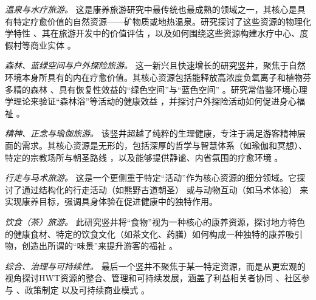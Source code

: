 \documentclass[UTF8, 12pt, a4paper, twoside]{ctexart}
\begin{document}
\textit{温泉与水疗旅游。} 这是康养旅游研究中最传统也最成熟的领域之一，其核心是具有特定疗愈价值的自然资源——矿物质或地热温泉。研究探讨了这些资源的物理化学特性 \parencite{dobrzynskiHydrogeochemicalBiomedicalInsights2018, zeynalPhysicalchemicalTreatmentPeculiarities2022a}、其在旅游开发中的价值评估 \parencite{borovicUtilizationTourismValorisation2015}，以及如何围绕这些资源构建水疗中心、度假村等商业实体 \parencite{chen2013investigating, dryglas2024critical, medaiFactorsContributingTourism2022a}。

\textit{森林、蓝绿空间与户外探险旅游。} 这一新兴且快速增长的研究竖井，聚焦于自然环境本身所具有的内在疗愈价值。其核心资源包括能释放高浓度负氧离子和植物芬多精的森林 \parencite{sorokaImportanceForestResources2016b, zoric2022developing}、具有恢复性效益的“绿色空间”与“蓝色空间” \parencite{irvineUnderstandingUrbanGreen2013, foleySwimmingIrelandImmersions2015}。研究常借鉴环境心理学理论来验证“森林浴”等活动的健康效益 \parencite{farkic2021forest, ohe2017evaluating}，并探讨户外探险活动如何促进身心福祉 \parencite{hannaActiveEngagementNature2019}。

\textit{精神、正念与瑜伽旅游。} 该竖井超越了纯粹的生理健康，专注于满足游客精神层面的需求。其核心资源是无形的，包括深厚的哲学与智慧体系（如瑜伽和冥想）\parencite{bowersYogaTourismCommodification2017, norman2017meditation}、特定的宗教场所与朝圣路线 \parencite{charanReligiousTourismIts2024a, tkaczynskiReligiousTourismSpiritual2018a}，以及能够提供静谧、内省氛围的疗愈环境 \parencite{choeFaithManifestSpiritual2020}。

\textit{行走与马术旅游。} 这是一个更侧重于特定“活动”作为核心资源的细分领域。它探讨了通过结构化的行走活动（如熊野古道朝圣）\parencite{katoSpiritualWalkingTourism2017} 或与动物互动（如马术体验）\parencite{danbyHumanEquineTourism2022, sigurdardottirWellnessEquestrianTourism2018a} 来实现康养目标，强调具身体验在促进健康中的独特作用。

\textit{饮食（茶）旅游。} 此研究竖井将“食物”视为一种核心的康养资源，探讨地方特色的健康食材、特定的饮食文化（如茶文化、药膳）如何构成一种独特的康养吸引物，创造出所谓的“味景”来提升游客的福祉 \parencite{choeLocalStakeholdersPerspectives2025a, suTeaDrinkingTastescapes2022a}。

\textit{综合、治理与可持续性。} 最后一个竖井不聚焦于某一特定资源，而是从更宏观的视角探讨HWT资源的整合、管理和可持续发展，涵盖了利益相关者协同 \parencite{romaoStakeholderbasedConjointAnalysis2022a}、社区参与 \parencite{khazaee-poolComprehensivePerspectiveLocal2024a}、政策制定 \parencite{johnstonPolicyImplicationsMedical2015} 以及可持续商业模式 \parencite{alharethiChartingSustainableCourse2024a}。
\end{document}
